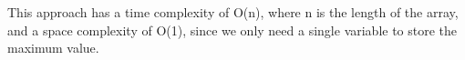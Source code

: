 \documentclass[preview]{standalone}
\begin{document}
This approach has a time complexity of O(n), where n is the length of the array, and a space complexity of O(1), since we only need a single variable to store the maximum value.\\
\end{document}
